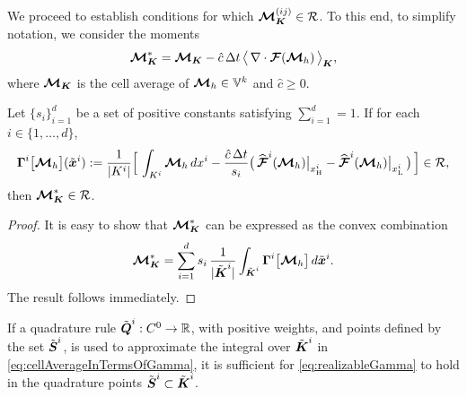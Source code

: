 We proceed to establish conditions for which $\boldsymbol{\mathcal{M}}_{\boldsymbol{K}}^{(ij)}\in\mathcal{R}$.  
To this end, to simplify notation, we consider the moments
\begin{equation}
  \boldsymbol{\mathcal{M}}_{\boldsymbol{K}}^{*}
  =\boldsymbol{\mathcal{M}}_{\boldsymbol{K}}-\hat{c}\,\Delta t\,\big\langle\,\nabla\cdot\boldsymbol{\mathcal{F}}(\boldsymbol{\mathcal{M}}_{h})\,\big\rangle_{\boldsymbol{K}},
\end{equation}
where $\boldsymbol{\mathcal{M}}_{\boldsymbol{K}}$ is the cell average of $\boldsymbol{\mathcal{M}}_{h}\in\mathbb{V}^{k}$ and $\hat{c}\ge0$.  
\begin{lemma}
  Let $\{s_{i}\}_{i=1}^{d}$ be a set of positive constants satisfying $\sum_{i=1}^{d}=1$.  
  If for each $i\in\{1,\ldots,d\}$, 
  \begin{equation}
    \boldsymbol{\Gamma}^{i}\big[\boldsymbol{\mathcal{M}}_{h}\big](\tilde{\boldsymbol{x}}^{i})
    :=\frac{1}{|K^{i}|}
    \Big[\,\int_{K^{i}}\boldsymbol{\mathcal{M}}_{h}\,dx^{i}-\frac{\hat{c}\,\Delta t}{s_{i}}\big(\,\widehat{\boldsymbol{\mathcal{F}}}^{i}(\boldsymbol{\mathcal{M}}_{h})\big|_{x_{\mbox{\tiny H}}^{i}}-\widehat{\boldsymbol{\mathcal{F}}}^{i}(\boldsymbol{\mathcal{M}}_{h})\big|_{x_{\mbox{\tiny L}}^{i}}\,\big)\,\Big]\in\mathcal{R},
    \label{eq:realizableGamma}
  \end{equation}
  then $\boldsymbol{\mathcal{M}}_{\boldsymbol{K}}^{*}\in\mathcal{R}$.  
\end{lemma}
\begin{proof}
  It is easy to show that $\boldsymbol{\mathcal{M}}_{\boldsymbol{K}}^{*}$ can be expressed as the convex combination
  \begin{equation}
    \boldsymbol{\mathcal{M}}_{\boldsymbol{K}}^{*}
    =\sum_{i=1}^{d}s_{i}\,\frac{1}{|\tilde{\boldsymbol{\boldsymbol{K}}}^{i}|}\int_{\tilde{\boldsymbol{K}}^{i}}\boldsymbol{\Gamma}^{i}\big[\boldsymbol{\mathcal{M}}_{h}\big]\,d\tilde{\boldsymbol{x}}^{i}.  
    \label{eq:cellAverageInTermsOfGamma}
  \end{equation}
  The result follows immediately.  
\end{proof}
\begin{rem}
  If a quadrature rule $\tilde{\boldsymbol{Q}}^{i}:C^{0}\to\mathbb{R}$, with positive weights, and points defined by the set $\tilde{\boldsymbol{S}}^{i}$, is used to approximate the integral over $\tilde{\boldsymbol{K}}^{i}$ in \eqref{eq:cellAverageInTermsOfGamma}, it is sufficient for \eqref{eq:realizableGamma} to hold in the quadrature points $\tilde{\boldsymbol{S}}^{i}\subset\tilde{\boldsymbol{K}}^{i}$.  
\end{rem}

